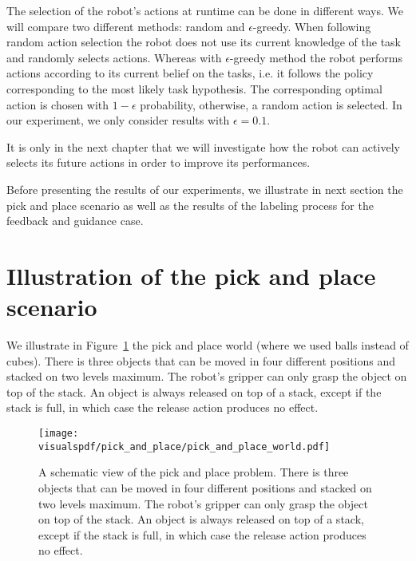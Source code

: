 The selection of the robot's actions at runtime can be done in different ways. We will compare two different methods: random and  $\epsilon$-greedy. When following random action selection the robot does not use its current knowledge of the task and randomly selects actions. Whereas with $\epsilon$-greedy method the robot performs actions according to its current belief on the tasks, i.e. it follows the policy corresponding to the most likely task hypothesis. The corresponding optimal action is chosen with $1-\epsilon$ probability, otherwise, a random action is selected. In our experiment, we only consider results with $\epsilon =  0.1$.

It is only in the next chapter that we will investigate how the robot can actively selects its future actions in order to improve its performances.

\transition

Before presenting the results of our experiments, we illustrate in next section the pick and place scenario as well as the results of the labeling process for the feedback and guidance case.

\section{Illustration of the pick and place scenario}
\label{chapter:lfui:pickplace}

We illustrate in Figure~\ref{fig:lfui:pickplaceworld} the pick and place world (where we used balls instead of cubes). There is three objects that can be moved in four different positions and stacked on two levels maximum. The robot's gripper can only grasp the object on top of the stack. An object is always released on top of a stack, except if the stack is full, in which case the release action produces no effect.

\begin{figure}[!htbp]
  \centering
  \texttt{[image: \\visualspdf/pick\_and\_place/pick\_and\_place\_world.pdf]}
  \caption{A schematic view of the pick and place problem. There is three objects that can be moved in four different positions and stacked on two levels maximum. The robot's gripper can only grasp the object on top of the stack. An object is always released on top of a stack, except if the stack is full, in which case the release action produces no effect.}
  \label{fig:lfui:pickplaceworld}
\end{figure}

